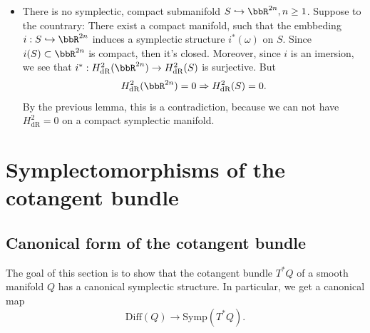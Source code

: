 \begin{example}
\begin{itemize}
        we have the chain of compositions
        \begin{center}
        \end{center}
        So we need to check that $g\mapsto l_{g,*e}^*dx_i(g)\in\fr{g}^*$ is smooth. To see this, lets $\gamma: I\to G$ be a curve 
        such that $\gamma(0)=e$, so $\gamma^\prime(0)\in\fr{g}$. Then 
        \begin{equation}
            dx_i\big|_g\circ l_{g,*e}\gamma^\prime(0)=\frac{d}{dt}\bigg|_{t=0}x_i(g\gamma(t))
        \end{equation}
        which is the derivative of the smooth function $(t,g)\mapsto x_i(g\gamma(t))$. To finnish the proof we just 
        observe that $\mathbb{S}^3$ is the Lie group of quaternions.
        \item There is no symplectic, compact submanifold $S\hookrightarrow \bbR^{2n},n\geq1$. Suppose to the countrary: 
        There exist a compact manifold, such that the embbeding $i: S\hookrightarrow \bbR^{2n}$ induces a symplectic structure 
        $i^*(\omega)$ on $S$. Since $i(S)\subset\bbR^{2n}$ is compact, then it's closed. Moreover, since $i$ is an imersion, we 
        see that $i^*:H_{\text{dR}}^2(\bbR^{2n})\to H_{\text{dR}}^2(S)$ is surjective. But 
        \begin{equation}
            H_{\text{dR}}^2(\bbR^{2n})=0\Rightarrow H_{\text{dR}}^2(S)=0.
        \end{equation}
        By the previous lemma, this is a contradiction, because we can not have $H_{\text{dR}}^2=0$ on a compact 
        symplectic manifold.
    \end{itemize}
\end{example}

\section{Symplectomorphisms of the cotangent bundle}
\subsection{Canonical form of the cotangent bundle}
The goal of this section is to show that the cotangent bundle $T^*Q$ of a smooth manifold $Q$ has a 
canonical symplectic structure. In particular, we get a canonical map 
\begin{equation}
    \text{Diff}(Q)\rightarrow \text{Symp}(T^*Q).
\end{equation}

